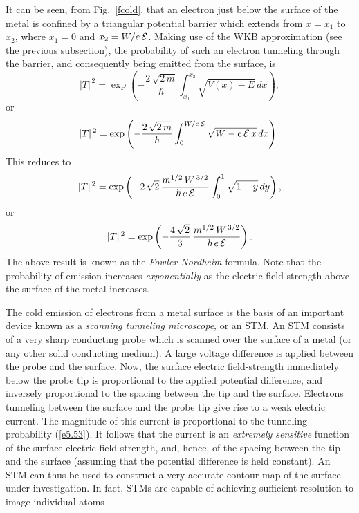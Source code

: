 It can be seen, from Fig.~\ref{fcold}, that an electron just below the  surface of the
metal is confined by a triangular potential barrier which extends from $x=x_1$ to $x_2$,
where $x_1=0$ and $x_2 = W / e\,{\cal E}$. Making use of the
WKB approximation (see the previous subsection), the probability of such an
electron tunneling through the barrier, and consequently being emitted from the surface,
is
\begin{equation}
|T|^{\,2} = \exp\left(-\frac{2\,\sqrt{2\,m}}{\hbar}\int_{x_1}^{x_2}
\sqrt{V(x)- E}\,dx\right),
\end{equation}
or
\begin{equation}
|T|^{\,2} = \exp\left(-\frac{2\,\sqrt{2\,m}}{\hbar}\int_{0}^{W/e\,{\cal E}}
\sqrt{W-e\,{\cal E}\,x }\,dx\right).
\end{equation}
This reduces to
\begin{equation}
|T|^{\,2} = \exp\left(-2\,\sqrt{2}\,\frac{m^{1/2}\,W^{\,3/2}}{\hbar\,e\,{\cal E}}\int_{0}^{1}
\sqrt{1-y}\,dy\right),
\end{equation}
or
\begin{equation}\label{e5.53}
|T|^{\,2} = \exp\left(-\frac{4\,\sqrt{2}}{3}\,\frac{m^{1/2}\,W^{\,3/2}}{\hbar\,e\,{\cal E}}\right).
\end{equation}
The above result is known as the {\em Fowler-Nordheim}\/ formula. Note that
the probability of emission increases {\em exponentially}\/ as the electric
field-strength above the surface of the metal increases.

The cold emission of electrons from a metal surface is the basis of
an important device known as a {\em scanning tunneling microscope}, or an STM. An STM consists of a very sharp conducting probe which is
scanned over the surface of a metal (or any other solid conducting medium). 
A large voltage difference is applied between the probe and the surface. Now, the surface electric
field-strength  immediately below the probe tip is proportional
to the applied potential difference, and inversely proportional to the spacing between
the tip and the surface. Electrons tunneling between the surface
and the probe tip give rise to a weak electric current. The magnitude of
this current is proportional to the tunneling probability (\ref{e5.53}). It
follows that the current is an {\em extremely sensitive}\/ function of the surface
electric field-strength, and, hence, of the spacing between the tip and the surface (assuming that the
potential difference is held constant). An STM can thus be used to construct
a very accurate contour map of the surface under investigation. In fact, STMs are
capable of achieving sufficient resolution to image individual atoms

